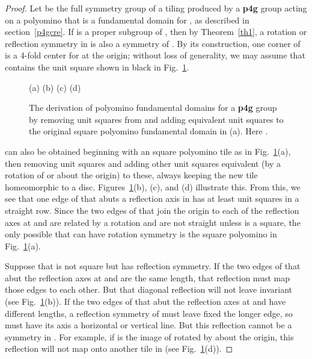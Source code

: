 \documentclass{ws-ijcga}
\begin{document}
\begin{proof}
Let  be the full symmetry group of a tiling  produced by a {\bf p4g} group  acting on a
polyomino  that is a fundamental domain for , as described in section~\ref{p4gcre}. 
If  is a proper
subgroup of , then by Theorem~\ref{th1}, 
a rotation or reflection symmetry in  is also a symmetry of . 
By its construction, one corner of  is a 4-fold center for  at the origin; 
without loss of generality, we may assume that  contains the unit square shown in black in Fig.~\ref{X}. 
\begin{figure}[h]
\centerline{
}
\centerline{(a) \hspace{1.0cm} (b) \hspace{1.0cm} (c) \hspace{1.0cm} (d)}
\vspace*{8pt}
\caption{
The derivation of polyomino fundamental domains  for a {\bf p4g} group by removing unit squares from and
adding equivalent unit squares to the original square polyomino fundamental domain in (a). Here .
\label{X}
}
\end{figure}
 can also be obtained beginning with an  square polyomino tile as in Fig.~\ref{X}(a), 
then removing unit squares and adding other unit squares equivalent (by a rotation of  or  about 
the origin) to
these, always keeping the new tile homeomorphic to a disc. 
Figures~\ref{X}(b), (c), and (d) illustrate this. 
From this, we see that one edge of  that abuts a reflection axis in  has at least  unit
squares in a straight row. Since the two edges of  that join the origin to each of the reflection
axes at  and  are related by a  rotation and 
are not straight unless  is a square, 
the only possible  that can have rotation symmetry is the square polyomino in Fig.~\ref{X}(a).

Suppose that  is not square but has reflection symmetry. 
If the two edges of  that abut the
reflection axes at  and  are the same length, 
that reflection must map those edges to each other. 
But that diagonal reflection will not leave  invariant (see Fig.~\ref{X}(b)). 
If the two edges of  that abut the reflection axes at  and  have 
different lengths, a reflection symmetry of 
must leave fixed the longer edge, so must have its axis a horizontal or vertical line. 
But this reflection cannot be a symmetry in . 
For example, if  is the image of  rotated by  about
the origin, this reflection will not map  onto another tile in  (see Fig.~\ref{X}(d)).
\end{proof}
\end{document}
